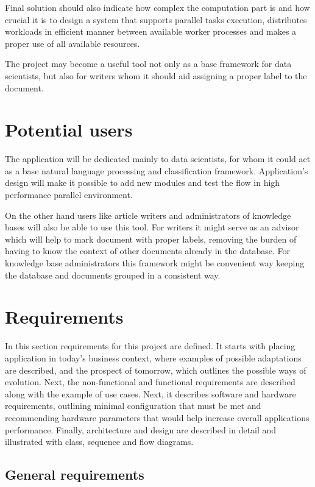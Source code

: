 Final solution should also indicate how complex the computation part is and how crucial it is to design a system that supports parallel tasks execution, distributes workloads in efficient manner between available worker processes and makes a proper use of all available resources.

The project may become a useful tool not only as a base framework for data scientists, but also for writers whom it should aid assigning a proper label to the document.

\section{Potential users} \label{design-users}
The application will be dedicated mainly to data scientists, for whom it could act as a base natural language processing and classification framework. Application's design will make it possible to add new modules and test the flow in high performance parallel environment.

On the other hand users like article writers and administrators of knowledge bases will also be able to use this tool. For writers it might serve as an advisor which will help to mark document with proper labels, removing the burden of having to know the context of other documents already in the database. For knowledge base administrators this framework might be convenient way keeping the database and documents grouped in a consistent way.

\section{Requirements}
In this section requirements for this project are defined. It starts with placing application in today's business context, where examples of possible adaptations are described, and the prospect of tomorrow, which outlines the possible ways of evolution. Next, the non-functional and functional requirements are described along with the example of use cases. Next, it describes software and hardware requirements, outlining minimal configuration that must be met and recommending hardware parameters that would help increase overall applications performance. Finally, architecture and design are described in detail and illustrated with class, sequence and flow diagrams.

\subsection{General requirements}
	

